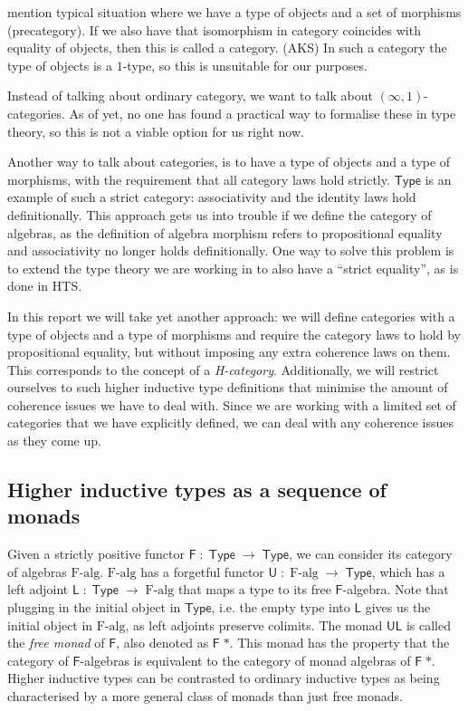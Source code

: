 \documentclass[a4paper,10pt]{article}
\newcommand{\Conid}[1]{\mathit{#1}}
\newcommand{\Varid}[1]{\mathit{#1}}
\renewcommand\Varid[1]{\mathord{\textsf{#1}}}
\let\Conid\Varid
\newcommand{\hit}{higher inductive type\xspace}
\newcommand{\Hits}{Higher inductive types\xspace}
\newcommand{\oits}{ordinary inductive types\xspace}
\newcommand{\ie}{i.e.\xspace}
\begin{document}
mention typical situation where we have a type of objects and a set of
morphisms (precategory). If we also have that isomorphism in category
coincides with equality of objects, then this is called a
category. (AKS) In such a category the type of objects is a $1$-type,
so this is unsuitable for our purposes.

Instead of talking about ordinary category, we want to talk about
$(\infty, 1)$-categories. As of yet, no one has found a practical way
to formalise these in type theory, so this is not a viable option for
us right now.

Another way to talk about categories, is to have a type of objects and
a type of morphisms, with the requirement that all category laws hold
strictly. \ensuremath{\Conid{Type}} is an example of such a strict category:
associativity and the identity laws hold definitionally. This approach
gets us into trouble if we define the category of algebras, as the
definition of algebra morphism refers to propositional equality and
associativity no longer holds definitionally. One way to solve this
problem is to extend the type theory we are working in to also have a
``strict equality'', as is done in HTS.

In this report we will take yet another approach: we will define
categories with a type of objects and a type of morphisms and require
the category laws to hold by propositional equality, but without
imposing any extra coherence laws on them. This corresponds to the
concept of a \emph{H-category}. Additionally, we will restrict
ourselves to such \hit definitions that minimise the amount of
coherence issues we have to deal with. Since we are working with a
limited set of categories that we have explicitly defined, we can deal
with any coherence issues as they come up.

\subsection{\Hits as a sequence of monads}

Given a strictly positive functor \ensuremath{\Conid{F}\;\mathbin{:}\;\Conid{Type}\;\to \;\Conid{Type}}, we can consider
its category of algebras \ensuremath{\Conid{F-alg}}. \ensuremath{\Conid{F-alg}} has a forgetful functor \ensuremath{\Conid{U}\;\mathbin{:}\;\Conid{F-alg}\;\to \;\Conid{Type}}, which has a left adjoint \ensuremath{\Conid{L}\;\mathbin{:}\;\Conid{Type}\;\to \;\Conid{F-alg}} that maps
a type to its free \ensuremath{\Conid{F}}-algebra. Note that plugging in the initial
object in \ensuremath{\Conid{Type}}, \ie the empty type into \ensuremath{\Conid{L}} gives us the initial
object in \ensuremath{\Conid{F-alg}}, as left adjoints preserve colimits. The monad \ensuremath{\Conid{UL}}
is called the \emph{free monad} of \ensuremath{\Conid{F}}, also denoted as \ensuremath{\Conid{F}\;\Varid{*}}. This
monad has the property that the category of \ensuremath{\Conid{F}}-algebras is equivalent
to the category of monad algebras of \ensuremath{\Conid{F}\;\Varid{*}}. \Hits can be contrasted to
\oits as being characterised by a more general class of monads than
just free monads.
\end{document}
